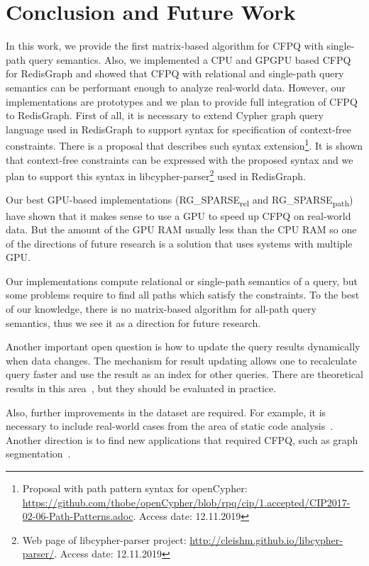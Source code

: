 \section{Conclusion and Future Work}
In this work, we provide the first matrix-based algorithm for CFPQ with single-path query semantics.
Also, we implemented a CPU and GPGPU based CFPQ for RedisGraph and showed that CFPQ with relational and single-path query semantics can be performant enough to analyze real-world data.
However, our implementations are prototypes and we plan to provide full integration of CFPQ to RedisGraph.
First of all, it is necessary to extend Cypher graph query language used in RedisGraph to support syntax for specification of context-free constraints.
There is a proposal that describes such syntax extension\footnote{Proposal with path pattern syntax for openCypher: \url{https://github.com/thobe/openCypher/blob/rpq/cip/1.accepted/CIP2017-02-06-Path-Patterns.adoc}. Access date: 12.11.2019}. It is shown that context-free constraints can be expressed with the proposed syntax and we plan to support this syntax in libcypher-parser\footnote{Web page of libcypher-parser project: \url{http://cleishm.github.io/libcypher-parser/}. Access date: 12.11.2019} used in RedisGraph.

Our best GPU-based implementations (RG\_SPARSE\textsubscript{rel} and RG\_SPARSE\textsubscript{path}) have shown that it makes sense to use a GPU to speed up CFPQ on real-world data. But the amount of the GPU RAM usually less than the CPU RAM so one of the directions of future research is a solution that uses systems with multiple GPU.

Our implementations compute relational or single-path semantics of a query, but some problems require to find all paths which satisfy the constraints.
To the best of our knowledge, there is no matrix-based algorithm for all-path query semantics, thus we see it as a direction for future research.

Another important open question is how to update the query results dynamically when data changes.
The mechanism for result updating allows one to recalculate query faster and use the result as an index for other queries. There are theoretical results in this area~\cite{10.1007/978-3-662-54458-7_16}, but they should be evaluated in practice.

Also, further improvements in the dataset are required.
For example, it is necessary to include real-world cases from the area of static code analysis~\cite{Zheng:2008:DAA:1328897.1328464,veduradabatch,LPAR-21:Cauliflower_Solver_Generator_for}.
Another direction is to find new applications that required CFPQ, such as graph segmentation~\cite{8731467}. 
